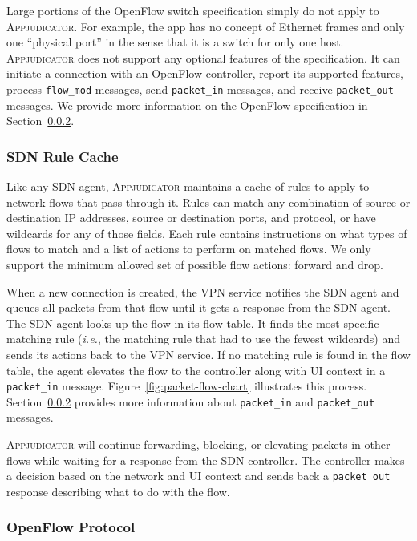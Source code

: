 Large portions of the OpenFlow switch specification simply do not apply to
\textsc{Appjudicator}. For example, the app has no concept of Ethernet frames
and only one ``physical port'' in the sense that it is a switch for only one
host. \textsc{Appjudicator} does not support any optional features of the
specification. It can initiate a connection with an OpenFlow controller, report
its supported features, process \texttt{flow\_mod} messages, send
\texttt{packet\_in} messages, and receive \texttt{packet\_out} messages. We
provide more information on the OpenFlow specification in
Section~\ref{sec:openflow-protocol}.

\subsubsection{SDN Rule Cache}
\label{sec:implementation-sdn-rule-cache}

Like any SDN agent, \textsc{Appjudicator} maintains a cache of rules to apply to
network flows that pass through it. Rules can match any combination of source or
destination IP addresses, source or destination ports, and protocol, or have
wildcards for any of those fields. Each rule contains instructions on what types
of flows to match and a list of actions to perform on matched flows. We only
support the minimum allowed set of possible flow actions: forward and drop.

When a new connection is created, the VPN service notifies the SDN agent and
queues all packets from that flow until it gets a response from the SDN agent.
The SDN agent looks up the flow in its flow table. It finds the most specific
matching rule (\textit{i.e.}, the matching rule that had to use the fewest
wildcards) and sends its actions back to the VPN service. If no matching rule is
found in the flow table, the agent elevates the flow to the controller along
with UI context in a \texttt{packet\_in} message.
Figure~\ref{fig:packet-flow-chart} illustrates this process.
Section~\ref{sec:openflow-protocol} provides more information about
\texttt{packet\_in} and \texttt{packet\_out} messages.

\textsc{Appjudicator} will continue forwarding, blocking, or elevating packets
in other flows while waiting for a response from the SDN controller. The
controller makes a decision based on the network and UI context and sends back a
\texttt{packet\_out} response describing what to do with the flow.

\subsubsection{OpenFlow Protocol}
\label{sec:openflow-protocol}

